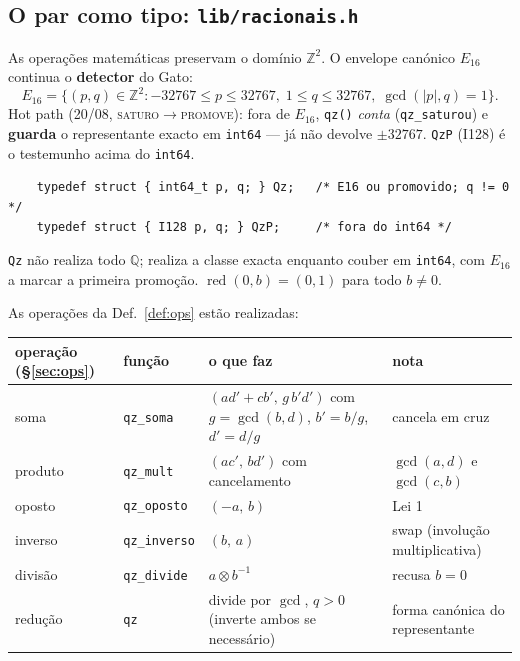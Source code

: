 \documentclass[11pt,a4paper]{article}
\newcommand{\code}[1]{\texttt{\small #1}}
\begin{document}
\subsection*{O par como tipo: \code{lib/racionais.h}}

As operações matemáticas preservam o domínio $\mathbb{Z}^{2}$. O envelope
canónico $E_{16}$ continua o \textbf{detector} do Gato:
\[
E_{16}=\bigl\{(p,q)\in\mathbb{Z}^{2}:
-32767\le p\le 32767,\;1\le q\le 32767,\;\gcd(|p|,q)=1\bigr\}.
\]
Hot path (20/08, \textsc{saturo}$\to$\textsc{promove}): fora de $E_{16}$,
\code{qz()} \emph{conta} (\code{qz\_saturou}) e \textbf{guarda} o representante
exacto em \code{int64} --- já não devolve $\pm32767$. \code{QzP} (I128) é o
testemunho acima do \code{int64}.
\begin{verbatim}
    typedef struct { int64_t p, q; } Qz;   /* E16 ou promovido; q != 0 */
    typedef struct { I128 p, q; } QzP;     /* fora do int64 */
\end{verbatim}
\code{Qz} não realiza todo $\mathbb{Q}$; realiza a classe exacta enquanto
couber em \code{int64}, com $E_{16}$ a marcar a primeira promoção.
$\operatorname{red}(0,b)=(0,1)$ para todo $b\neq 0$.

As operações da Def.~\ref{def:ops} estão realizadas:

\begin{center}\small
\begin{tabular}{@{}llll@{}}
\toprule
operação (§\ref{sec:ops}) & função & o que faz & nota \\
\midrule
soma        & \code{qz\_soma}     & $(ad'+cb',\,g\,b'd')$ com $g=\gcd(b,d)$, $b'=b/g$, $d'=d/g$ & cancela em cruz \\
produto     & \code{qz\_mult}     & $(ac',\,bd')$ com cancelamento & $\gcd(a,d)$ e $\gcd(c,b)$ \\
oposto      & \code{qz\_oposto}   & $(-a,\,b)$ & Lei 1 \\
inverso     & \code{qz\_inverso}  & $(b,\,a)$ & swap (involução multiplicativa) \\
divisão     & \code{qz\_divide}   & $a \otimes b^{-1}$ & recusa $b=0$ \\
redução     & \code{qz}           & divide por $\gcd$, $q>0$ (inverte ambos se necessário) & forma canónica do representante \\
\bottomrule
\end{tabular}
\end{center}
\end{document}
